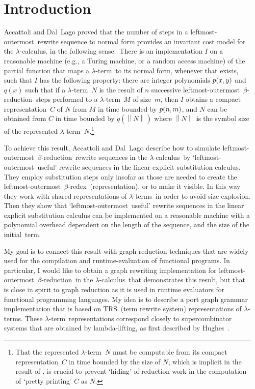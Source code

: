 \documentclass[
submission
]{dmtcs-episciences-tampered}
\newcommand{\fap}[2]{#1({#2})}
\newcommand{\bfap}[3]{{#1}({#2},\hspace*{0.05pt}{#3})}
\newcommand{\nb}{\nobreakdash}
\newcommand{\TRS}{TRS}
\newcommand{\size}[1]{\left\lVert{#1}\right\rVert}
\newcommand{\alter}{M}
\newcommand{\blter}{N}
\newcommand{\lambdacalculus}{$\lambda$\nb-cal\-cu\-lus}
\newcommand{\lambdaterm}{$\lambda$\nb-term}
\newcommand{\lambdaterms}{\lambdaterm{s}}
\newcommand{\lambdalifting}{lambda-lif\-ting}
\newcommand{\betareduction}{$\beta$\nb-re\-duc\-tion}
\newcommand{\betaredex}{$\beta$\nb-re\-dex}
\newcommand{\lo}{left\-most-outer\-most}
\theoremstyle{plain}
\theoremstyle{definition}
\begin{document}
\section{Introduction}
Accattoli and Dal~Lago \cite{acca:lago:2014:beta-reduction-invariant:LICS,acca:lago:2016}
proved that the number of steps in a
\lo\ rewrite sequence to normal form provides an invariant cost model for the \lambdacalculus, in the following sense.\ 
There is an implementation $I$ on a reasonable machine (e.g., a Turing machine, or a random access machine)
of the partial function that maps a \lambdaterm\ to its normal form, whenever that exists,
such that $I$ has the following property: 
there are integer polynomials $\bfap{p}{x}{y}$ and $\fap{q}{x}$
such that if a \lambdaterm~$\blter$ is the result of $n$ successive \lo\ \betareduction\ steps performed to a \lambdaterm~$\alter$ of size~$m$,
then $I$ obtains a compact representation~$C$ of $\blter$ from $\alter$
in time bounded by $\bfap{p}{n}{m}$, 
and $\blter$ can be obtained from $C$ in time bounded by $\fap{q}{\size{\blter}}$ where $\size{\blter}$ is the symbol size of 
the represented \lambdaterm~$\blter$.\footnote{That the represented \lambdaterm~$\blter$ must be computable from its compact representation~$C$
            in time bounded by the size of $\blter$,
            which is implicit in the result of \cite{acca:lago:2014:beta-reduction-invariant:LICS,acca:lago:2016},
            is crucial to prevent `hiding' of reduction work in the computation of `pretty printing' $C$ as $\blter$.} 


To achieve this result, Accattoli and Dal~Lago describe how to simulate \lo\ \betareduction\ rewrite sequences in the \lambdacalculus\ by
`\lo\ useful' rewrite sequences in the linear explicit substitution calculus.
They employ substitution steps only insofar as those are needed to 
create the \lo\ \betaredex\ (representation), or to make it visible. 
In this way they work with shared representations of \lambdaterms\ in order to avoid size explosion. 
Then they show that `\lo\ useful' rewrite sequences in the linear explicit substitution calculus can be implemented on a reasonable machine
with a polynomial overhead dependent on the length of the sequence, and the size of the initial~term.\pagebreak[4]   

My goal is to connect this result with  graph reduction techniques that are widely used for the compilation and runtime-evaluation of functional programs.
In particular, I would like to obtain a graph rewriting implementation for \lo\ \betareduction\ in the \lambdacalculus\
that demonstrates this result, but that is close in spirit to graph reduction as it is used in runtime evaluators for functional programming languages.  
My idea is to describe a port graph grammar \cite{stew:2002} implementation that is based on 
\TRS\ (term rewrite system) representation{s} of \lambdaterm{s}.
These \lambdaterm\ representations correspond closely to supercombinator systems that are obtained by \lambdalifting, as first described by Hughes~\cite{hugh:1982:report}.
\end{document}
